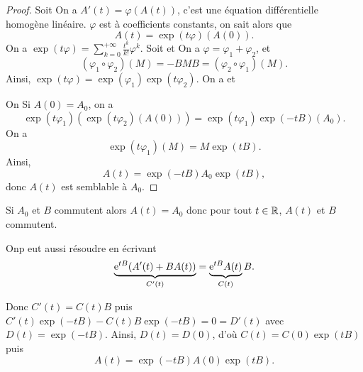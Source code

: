 \documentclass[12pt]{article}
\begin{document}
\begin{proof}
	Soit 
	On a $A'(t)=\varphi(A(t))$, c'est une équation différentielle homogène linéaire. $\varphi$ est à coefficients constants, on sait alors que 
	\begin{equation}
		A(t)=\exp(t\varphi)(A(0)).
	\end{equation}
	On a $\exp(t\varphi)=\sum_{k=0}^{+\infty}\frac{t^{k}}{k!}\varphi^{k}$. Soit  et 
	On a $\varphi=\varphi_1+\varphi_2$, et 
	\begin{equation}
		\left(\varphi_1\circ\varphi_2\right)(M)=-BMB=(\varphi_2\circ\varphi_1)(M).
	\end{equation}
	Ainsi, $\exp(t\varphi)=\exp(\varphi_1)\exp(t\varphi_2)$. On a  et  

	On Si $A(0)=A_0$, on a
	\begin{equation}
		\exp(t\varphi_1)\left(\exp(t\varphi_2)(A(0))\right)=\exp(t\varphi_1)\exp(-tB)(A_0).
	\end{equation}
	On a 
	\begin{equation}
		\exp(t\varphi_{1})(M)=M\exp(tB).
	\end{equation}
	Ainsi,
	\begin{equation}
		A(t)=\exp(-tB)A_0\exp(tB),
	\end{equation}
	donc $A(t)$ est semblable à $A_0$.
\end{proof}

\begin{remark}
	Si $A_0$ et $B$ commutent alors $A(t)=A_0$ donc pour tout $t\in\mathbb{R}$, $A(t)$ et $B$ commutent.
\end{remark}

\begin{remark}
	Onp eut aussi résoudre en écrivant 
	\begin{equation}
		\underbrace{\mathrm{e}^{tB}(A'(t)+BA(t))}_{C'(t)}=\underbrace{\mathrm{e}^{tB}A(t)}_{C(t)}B.
	\end{equation}

	Donc $C'(t)=C(t)B$ puis $C'(t)\exp(-tB)-C(t)B\exp(-tB)=0=D'(t)$ avec $D(t)=\exp(-tB)$. Ainsi, $D(t)=D(0)$, d'où $C(t)=C(0)\exp(tB)$ puis 
	\begin{equation}
		A(t)=\exp(-tB)A(0)\exp(tB).
	\end{equation}
\end{remark}
\end{document}
